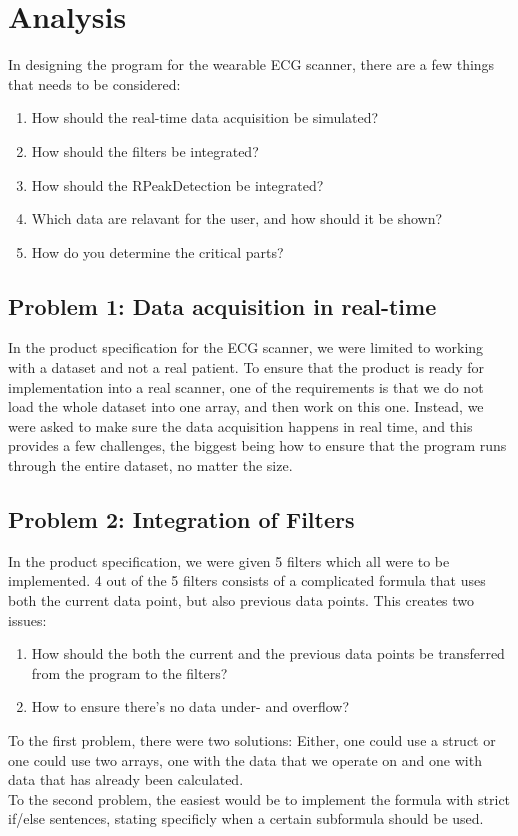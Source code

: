 \documentclass[12pt,a4paper]{article}
\begin{document}
\section{Analysis}
 	In designing the program for the wearable ECG scanner, there are a few things that needs to be considered:
\begin{enumerate}
	\item How should the real-time data acquisition be simulated?
	\item How should the filters be integrated?
	\item How should the RPeakDetection be integrated?
	\item Which data are relavant for the user, and how should it be shown?
	\item How do you determine the critical parts?
\end{enumerate}

\subsection{Problem 1: Data acquisition in real-time}
	In the product specification for the ECG scanner, we were limited to working with a dataset and not a real patient. To ensure that the product is ready for implementation into a real scanner, one of the requirements is that we do not load the whole dataset into one array, and then work on this one. Instead, we were asked to make sure the data acquisition happens in real time, and this provides a few challenges, the biggest being how to ensure that the program runs through the entire dataset, no matter the size.

\subsection{Problem 2: Integration of Filters}
	In the product specification, we were given 5 filters which all were to be implemented. 4 out of the 5 filters consists of a complicated formula that uses both the current data point, but also previous data points. This creates two issues:
\begin{enumerate}
	\item How should the both the current and the previous data points be transferred from the program to the filters?
	\item How to ensure there's no data under- and overflow?
\end{enumerate}
To the first problem, there were two solutions: Either, one could use a struct or one could use two arrays, one with the data that we operate on and one with data that has already been calculated.\\
To the second problem, the easiest would be to implement the formula with strict if/else sentences, stating specificly when a certain subformula should be used.
\end{document}
